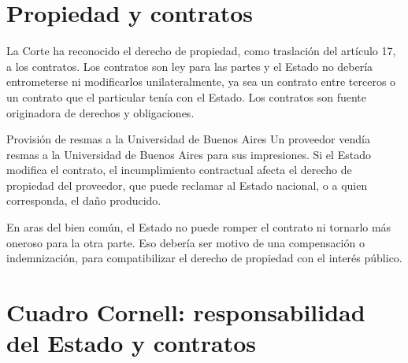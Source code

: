 \documentclass[12pt,oneside]{book}
\begin{document}
\section{Propiedad y contratos}

La Corte ha reconocido el derecho de propiedad, como traslación del artículo 17, a los contratos. Los contratos son ley para las partes y el Estado no debería entrometerse ni modificarlos unilateralmente, ya sea un contrato entre terceros o un contrato que el particular tenía con el Estado. Los contratos son fuente originadora de derechos y obligaciones.

\begin{example}{Provisión de resmas a la Universidad de Buenos Aires}
Un proveedor vendía resmas a la Universidad de Buenos Aires para sus impresiones. Si el Estado modifica el contrato, el incumplimiento contractual afecta el derecho de propiedad del proveedor, que puede reclamar al Estado nacional, o a quien corresponda, el daño producido.
\end{example}

En aras del bien común, el Estado no puede romper el contrato ni tornarlo más oneroso para la otra parte. Eso debería ser motivo de una compensación o indemnización, para compatibilizar el derecho de propiedad con el interés público.

\section{Cuadro Cornell: responsabilidad del Estado y contratos}
\end{document}
